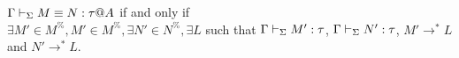 \begin{lemma}
	$\Gamma \vdash_\Sigma M \equiv N : \tau @A$ if and only if\\
	$\exists M' \in M^\%, M' \in M^\%, \exists N' \in N^\%, \exists L$
	such that $\Gamma \vdash_\Sigma M' : \tau$, $\Gamma \vdash_\Sigma N' : \tau$, $M' \longrightarrow^* L$ and $N' \longrightarrow^* L$.
\end{lemma}
	
	
	
%
% 
% 
